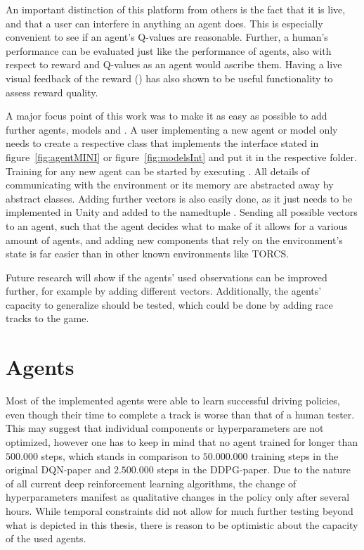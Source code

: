 An important distinction of this platform from others is the fact that it is live, and that a user can interfere in anything an agent does. This is especially convenient to see if an agent's Q-values are reasonable. Further, a human's performance can be evaluated just like the performance of agents, also with respect to reward and Q-values as an agent would ascribe them. Having a live visual feedback of the reward () has also shown to be useful functionality to assess reward quality.

A major focus point of this work was to make it as easy as possible to add further agents, models and . A user implementing a new agent or model only needs to create a respective class that implements the interface stated in figure~\ref{fig:agentMINI} or figure~\ref{fig:modelsInt} and put it in the respective folder. Training for any new agent can be started by executing . All details of communicating with the environment or its memory are abstracted away by abstract classes. Adding further vectors is also easily done, as it just needs to be implemented in Unity and added to the namedtuple . Sending all possible vectors to an agent, such that the agent decides what to make of it allows for a various amount of agents, and adding new components that rely on the environment's state is far easier than in other known environments like TORCS.

Future research will show if the agents' used observations can be improved further, for example by adding different vectors. Additionally, the agents' capacity to generalize should be tested, which could be done by adding race tracks to the game.

\section{Agents}

Most of the implemented agents were able to learn successful driving policies, even though their time to complete a track is worse than that of a human tester. This may suggest that individual components or hyperparameters are not optimized, however one has to keep in mind that no agent trained for longer than $500.000$ steps, which stands in comparison to $50.000.000$ training steps in the original DQN-paper and $2.500.000$ steps in the DDPG-paper. Due to the nature of all current deep reinforcement learning algorithms, the change of hyperparameters manifest as qualitative changes in the policy only after several hours. While temporal constraints did not allow for much further testing beyond what is depicted in this thesis, there is reason to be optimistic about the capacity of the used agents. 

